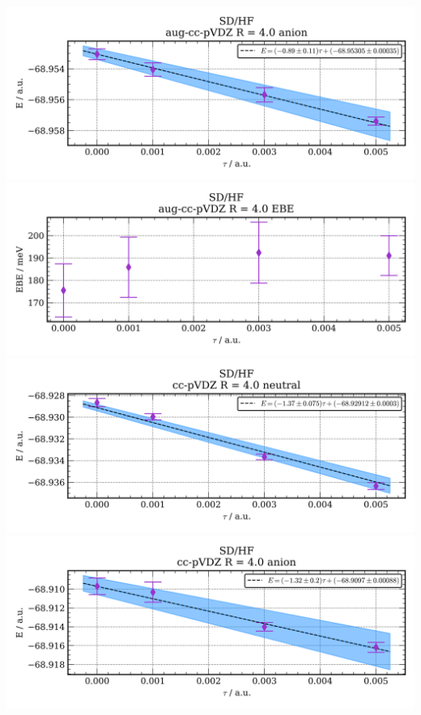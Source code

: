 \includegraphics[width=\textwidth,keepaspectratio]{images/SDshivHF__aug-cc-pvdz__4p0_02_anion.png}
\includegraphics[width=\textwidth,keepaspectratio]{images/SDshivHF__aug-cc-pvdz__4p0_03_ebe.png}
\includegraphics[width=\textwidth,keepaspectratio]{images/SDshivHF__cc-pvdz__4p0_01_neutral.png}
\includegraphics[width=\textwidth,keepaspectratio]{images/SDshivHF__cc-pvdz__4p0_02_anion.png}
